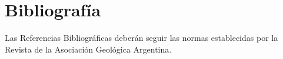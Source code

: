 \setcounter{figure}{0} %
\renewcommand{\thefigure}{\thesection.\arabic{figure}}
\chapter*{Bibliografía}
Las Referencias Bibliográficas deberán seguir las normas establecidas por la Revista de la Asociación Geológica Argentina. 
